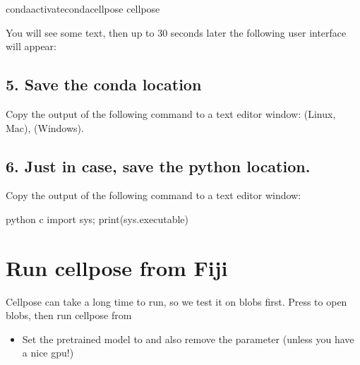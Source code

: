 \documentclass[letterpaper,10pt,english]{jupyterBook}
\begin{document}
\begin{sphinxVerbatim}[commandchars=\\\{\}]
condaactivatecondacellpose
cellpose
\end{sphinxVerbatim}

\sphinxAtStartPar
You will see some text, then up to 30 seconds later the following user interface will appear:

\sphinxAtStartPar
{}


\subsection{5. Save the conda location}
\label{\detokenize{cellpose:save-the-conda-location}}
\sphinxAtStartPar
Copy the output of the following command to a text editor window:  (Linux, Mac),  (Windows).


\subsection{6. Just in case, save the python location.}
\label{\detokenize{cellpose:just-in-case-save-the-python-location}}
\sphinxAtStartPar
Copy the output of the following command to a text editor window:

\begin{sphinxVerbatim}[commandchars=\\\{\}]
python \PYGZhy{}c \PYGZdq{}import sys; print(sys.executable)\PYGZdq{}
\end{sphinxVerbatim}


\section{Run cellpose from Fiji}
\label{\detokenize{cellpose:run-cellpose-from-fiji}}
\sphinxAtStartPar
Cellpose can take a long time to run, so we test it on blobs first. Press  to open blobs, then run cellpose from 

\sphinxAtStartPar
{}
\begin{itemize}
\item {} 
\sphinxAtStartPar
Set the pretrained model to  and also remove the parameter  (unless you have a nice gpu!)

\end{itemize}
\end{document}
